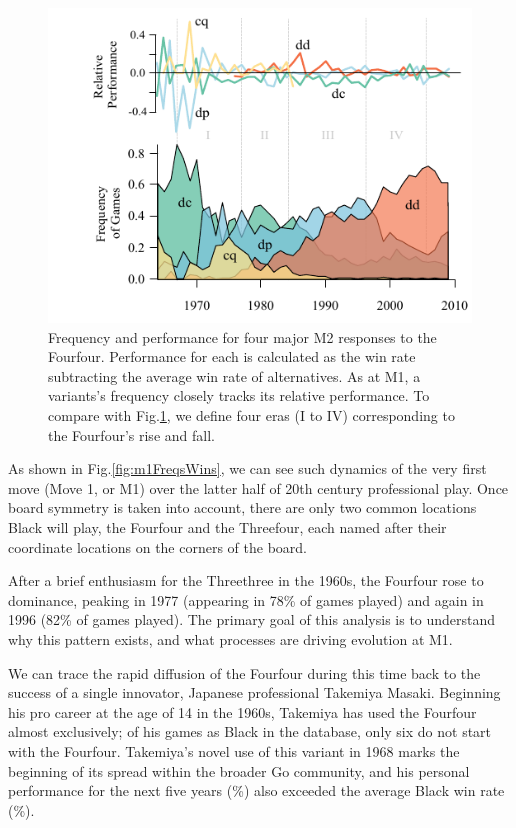 \documentclass[reqno,12pt]{amsart}
\begin{document}
\begin{figure}[t]
  \begin{center}
    \includegraphics[scale=1.2]{./assets/m2FreqsWins.pdf}
    \caption{Frequency and performance for four major M2 responses to the Fourfour. Performance for each is calculated as the win rate subtracting the average win rate of alternatives. As at M1, a variants's frequency closely tracks its relative performance. To compare with Fig.\;\ref{fig:m2FreqsWins}, we define four eras (I to IV) corresponding to the Fourfour's rise and fall.}
    \label{fig:m2FreqsWins}
  \end{center}
\end{figure}

\clearpage

As shown in Fig.\;\ref{fig:m1FreqsWins}, we can see such dynamics of the very first move (Move 1, or M1) over the latter half of 20th century professional play. Once board symmetry is taken into account, there are only two common locations Black will play, the Fourfour and the Threefour, each named after their coordinate locations on the corners of the board.

After a brief enthusiasm for the Threethree in the 1960s, the Fourfour rose to dominance, peaking in 1977 (appearing in 78\% of games played) and again in 1996 (82\% of games played). The primary goal of this analysis is to understand why this pattern exists, and what processes are driving evolution at M1.

We can trace the rapid diffusion of the Fourfour during this time back to the success of a single innovator, Japanese professional Takemiya Masaki. Beginning his pro career at the age of 14 in the 1960s, Takemiya has used the Fourfour almost exclusively; of his \nGamesTakemiya{} games as Black in the database, only six do not start with the Fourfour. Takemiya's novel use of this variant in 1968 marks the beginning of its spread within the broader Go community, and his personal performance for the next five years (\winRateBlackTakemiya\%) also exceeded the average Black win rate (\winRateBlack\%).
\end{document}
